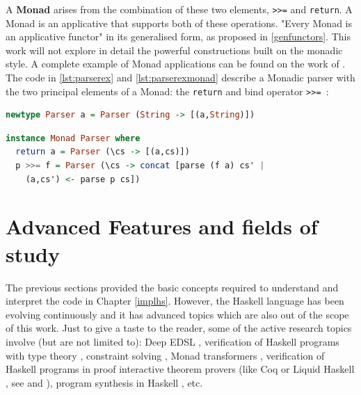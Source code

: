 A \textbf{Monad} arises from the combination of these two elements, \lstinline!>>=! and \lstinline!return!. A Monad is an applicative that supports both of these operations. "Every Monad is an applicative functor"\cite{lipovaca2011learn} in its generalised form, as proposed in \ref{genfunctors}. This work will not explore in detail the powerful constructions built on the monadic style. A complete example of Monad applications can be found on the work of \cite{hutton1998monadic}. The code in \cref{lst:parserex} and \cref{lst:parserexmonad} describe a Monadic parser with the two principal elements of a Monad: the \lstinline!return! and bind operator \lstinline!>>= !:

\begin{lstlisting}[language=Haskell, caption={Declaring the type Parser}, captionpos=b, label={lst:parserex}]
newtype Parser a = Parser (String -> [(a,String)])
\end{lstlisting}

\begin{lstlisting}[language=Haskell, caption={Declaring the type Parser}, captionpos=b, label={lst:parserexmonad}]
instance Monad Parser where
  return a = Parser (\cs -> [(a,cs)])
  p >>= f = Parser (\cs -> concat [parse (f a) cs' |
    (a,cs') <- parse p cs])
\end{lstlisting}

\section{Advanced Features and fields of study}

The previous sections provided the basic concepts required to understand and interpret the code in Chapter \ref{implhs}. However, the Haskell language has been evolving continuously and it has advanced topics which are also out of the scope of this work. Just to give a taste to the reader, some of the active research topics involve (but are not limited to): Deep EDSL \cite{gill2014domain}, verification of Haskell programs with type theory \cite{abel2005verifying}, constraint solving \cite{hallahan2019g2q}, Monad transformers \cite{schrijvers2016monad}, verification of Haskell programs in proof interactive theorem provers (like Coq \cite{coqurl} or Liquid Haskell \cite{liquidhaskell}, see \cite{Christiansen} and \cite{vazou2016liquid}), program synthesis in Haskell \cite{Finkbeiner}, etc.










